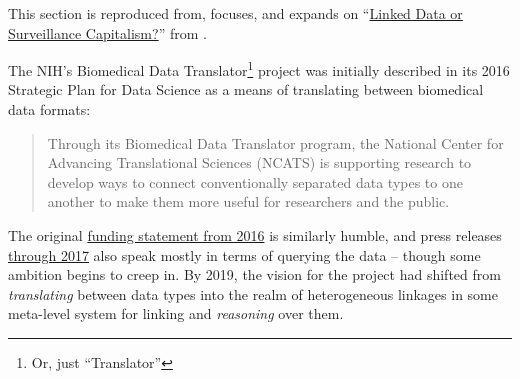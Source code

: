 This section is reproduced from, focuses, and expands on
``\href{https://jon-e.net/infrastructure/\#linked-data-or-surveillance-capitalism}{Linked
Data or Surveillance Capitalism?}'' from \cite{saundersDecentralizedInfrastructureNeuro2022} .

The NIH's Biomedical Data Translator\footnote{Or, just ``Translator''}
project was initially described in its 2016 Strategic Plan for Data
Science as a means of translating between biomedical data formats:

\begin{quote}
Through its Biomedical Data Translator program, the National Center for
Advancing Translational Sciences (NCATS) is supporting research to
develop ways to connect conventionally separated data types to one
another to make them more useful for researchers and the public. \cite{NIHStrategicPlan2018} 
\end{quote}

The original
\href{https://web.archive.org/web/20210709100523/https://ncats.nih.gov/news/releases/2016/feasibility-assessment-translator}{funding
statement from 2016} is similarly humble, and press releases
\href{https://web.archive.org/web/20210709171335/https://ncats.nih.gov/pubs/features/translator}{through
2017} also speak mostly in terms of querying the data -- though some
ambition begins to creep in. By 2019, the vision for the project had
shifted from \emph{translating} between data types into the realm of
heterogeneous linkages in some meta-level system for linking and
\emph{reasoning} over them.

